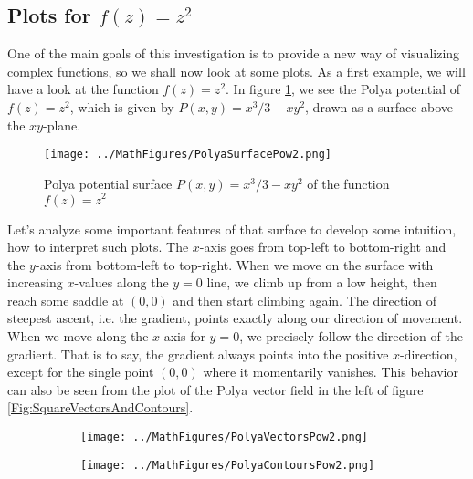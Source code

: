 \documentclass[12pt]{article}
\begin{document}
\subsection{Plots for $f(z) = z^2$}
One of the main goals of this investigation is to provide a new way of visualizing complex functions, so we shall now look at some plots. As a first example, we will have a look at the function $f(z) = z^2$. In figure \ref{Fig:SquareSurface}, we see the Polya potential of $f(z) = z^2$, which is given by $P(x,y) = x^3/3 - x y^2$, drawn as a surface above the $xy$-plane. 
\begin{figure}[h]
\caption{Polya potential surface $P(x,y) = x^3/3 - x y^2$ of the function $f(z) = z^2$}	
\label{Fig:SquareSurface}	
\centering
\texttt{[image: ../MathFigures/PolyaSurfacePow2.png]}
\end{figure}
Let's analyze some important features of that surface to develop some intuition, how to interpret such plots. The $x$-axis goes from top-left to bottom-right and the $y$-axis from bottom-left to top-right. When we move on the surface with increasing $x$-values along the $y=0$ line, we climb up from a low height, then reach some saddle at $(0,0)$ and then start climbing again. The direction of steepest ascent, i.e. the gradient, points exactly along our direction of movement. When we move along the $x$-axis for $y=0$, we precisely follow the direction of the gradient. That is to say, the gradient always points into the positive $x$-direction, except for the single point $(0,0)$ where it momentarily vanishes. This behavior can also be seen from the plot of the Polya vector field in the left of figure \ref{Fig:SquareVectorsAndContours}. 
\begin{figure}[h]
\caption{Polya vector field and Polya potential contours of $f(z) = z^2$}	
\label{Fig:SquareVectorsAndContours}
\centering
\begin{subfigure}[b]{0.49\textwidth}
\centering
\texttt{[image: ../MathFigures/PolyaVectorsPow2.png]} 
\end{subfigure}
\begin{subfigure}[b]{0.49\textwidth}
\centering
\texttt{[image: ../MathFigures/PolyaContoursPow2.png]}
\end{subfigure}
\end{figure}
\end{document}
